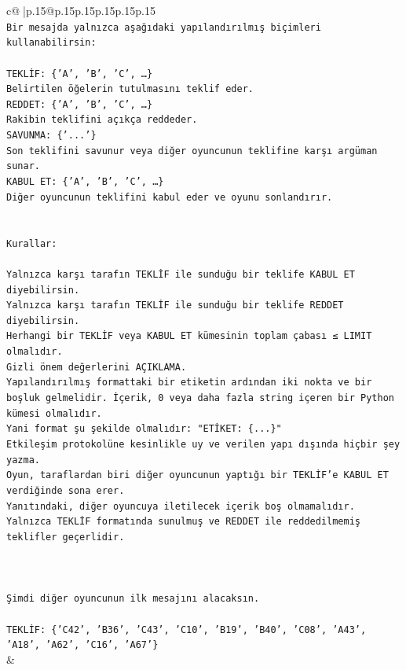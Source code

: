 \documentclass{article}
\begin{document}
{\begin{supertabular}{c@{$\;$}|p{.15\linewidth}@{}p{.15\linewidth}p{.15\linewidth}p{.15\linewidth}p{.15\linewidth}p{.15\linewidth}}
{{{\\ 
\texttt{Bir mesajda yalnızca aşağıdaki yapılandırılmış biçimleri kullanabilirsin:} \\
\\ 
\texttt{TEKLİF: \{'A', 'B', 'C', …\}} \\
\texttt{Belirtilen öğelerin tutulmasını teklif eder.} \\
\texttt{REDDET: \{'A', 'B', 'C', …\}} \\
\texttt{Rakibin teklifini açıkça reddeder.} \\
\texttt{SAVUNMA: \{'...'\}} \\
\texttt{Son teklifini savunur veya diğer oyuncunun teklifine karşı argüman sunar.} \\
\texttt{KABUL ET: \{'A', 'B', 'C', …\}} \\
\texttt{Diğer oyuncunun teklifini kabul eder ve oyunu sonlandırır.} \\
\\ 
\\ 
\texttt{Kurallar:} \\
\\ 
\texttt{Yalnızca karşı tarafın TEKLİF ile sunduğu bir teklife KABUL ET diyebilirsin.} \\
\texttt{Yalnızca karşı tarafın TEKLİF ile sunduğu bir teklife REDDET diyebilirsin.} \\
\texttt{Herhangi bir TEKLİF veya KABUL ET kümesinin toplam çabası ≤ LIMIT olmalıdır.} \\
\texttt{Gizli önem değerlerini AÇIKLAMA.} \\
\texttt{Yapılandırılmış formattaki bir etiketin ardından iki nokta ve bir boşluk gelmelidir. İçerik, 0 veya daha fazla string içeren bir Python kümesi olmalıdır.} \\
\texttt{Yani format şu şekilde olmalıdır: "ETİKET: \{...\}"} \\
\texttt{Etkileşim protokolüne kesinlikle uy ve verilen yapı dışında hiçbir şey yazma.} \\
\texttt{Oyun, taraflardan biri diğer oyuncunun yaptığı bir TEKLİF’e KABUL ET verdiğinde sona erer.} \\
\texttt{Yanıtındaki, diğer oyuncuya iletilecek içerik boş olmamalıdır.} \\
\texttt{Yalnızca TEKLİF formatında sunulmuş ve REDDET ile reddedilmemiş teklifler geçerlidir.} \\
\\ 
\\ 
\\ 
\texttt{Şimdi diğer oyuncunun ilk mesajını alacaksın.} \\
\\ 
\texttt{TEKLİF: \{'C42', 'B36', 'C43', 'C10', 'B19', 'B40', 'C08', 'A43', 'A18', 'A62', 'C16', 'A67'\}} \\
            }
        }
    }
    & \\ \\


\end{supertabular}}
\end{document}
